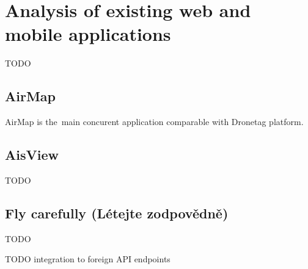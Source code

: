 \chapter{Analysis of existing web and mobile applications}\label{ch:analysis-of-existing-web-and-mobile-applications}

TODO

\section{AirMap}\label{sec:airmap}
AirMap is the~main concurent application comparable with Dronetag platform.%

\section{AisView}\label{sec:aisview}
TODO

\section{Fly carefully (Létejte zodpovědně)}\label{sec:fly-carefully}
TODO


TODO integration to foreign API endpoints

